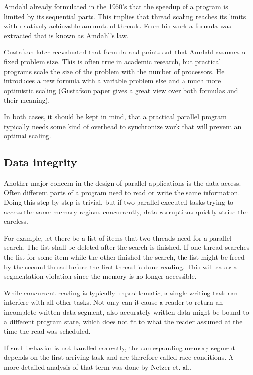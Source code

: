Amdahl already formulated in the 1960's that the speedup of a program is limited by its sequential parts\cite{amdahl1967validity}. This implies that thread scaling reaches its limits with relatively achievable amounts of threads. From his work a formula was extracted that is known as Amdahl's law. 

Gustafson later reevaluated that formula\cite{gustafson1988reevaluating} and points out that Amdahl assumes a fixed problem size. This is often true in academic research, but practical programs scale the size of the problem with the number of processors. He introduces a new formula with a variable problem size and a much more optimistic scaling (Gustafson paper gives a great view over both formulas and their meaning).

In both cases, it should be kept in mind, that a practical parallel program typically needs some kind of overhead to synchronize work that will prevent an optimal scaling. 

\subsection{Data integrity}
Another major concern in the design of parallel applications is the data access. Often different parts of a program need to read or write the same information. Doing this step by step is trivial, but if two parallel executed tasks trying to access the same memory regions concurrently, data corruptions quickly strike the careless. 

For example, let there be a list of items that two threads need for a parallel search. The list shall be deleted after the search is finished. If one thread searches the list for some item while the other finished the search, the list might be freed by the second thread before the first thread is done reading. This will cause a segmentation violation since the memory is no longer accessible.

While concurrent reading is typically unproblematic, a single writing task can interfere with all other tasks. Not only can it cause a reader to return an incomplete written data segment, also accurately written data might be bound to a different program state, which does not fit to what the reader assumed at the time the read was scheduled.

If such behavior is not handled correctly, the corresponding memory segment depends on the first arriving task and are therefore called race conditions. A more detailed analysis of that term was done by Netzer et. al.\cite{netzer1992race}.

